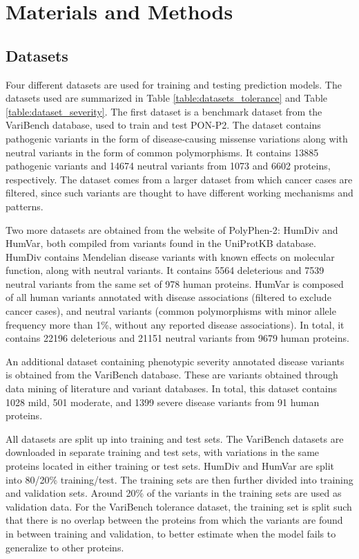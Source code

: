 \documentclass[11pt]{article}
\begin{document}
\section{Materials and Methods}

\subsection{Datasets}

Four different datasets are used for training and testing prediction models. The datasets used are summarized in Table \ref{table:datasets_tolerance} and Table \ref{table:dataset_severity}. 
The first dataset is a benchmark dataset from the VariBench\cite{nair2013varibench} database, used to train and test PON-P2\cite{niroula2015pon}. The dataset contains pathogenic variants in the form of disease-causing missense variations along with neutral variants in the form of common polymorphisms. It contains 13885 pathogenic variants and 14674 neutral variants from 1073 and 6602 proteins, respectively. The dataset comes from a larger dataset from which cancer cases are filtered, since such variants are thought to have different working mechanisms and patterns.

Two more datasets are obtained from the website of PolyPhen-2\cite{PolyPhen-2data}: HumDiv and HumVar, both compiled from variants found in the UniProtKB database. HumDiv contains Mendelian disease variants with known effects on molecular function, along with neutral variants. It contains 5564 deleterious and 7539 neutral variants from the same set of 978 human proteins. HumVar is composed of all human variants annotated with disease associations (filtered to exclude cancer cases), and neutral variants (common polymorphisms with minor allele frequency more than 1\%, without any reported disease associations). In total, it contains 22196 deleterious and 21151 neutral variants from 9679 human proteins.

An additional dataset containing phenotypic severity annotated disease variants is obtained from the VariBench database. These are variants obtained through data mining of literature and variant databases\cite{niroula2017predicting}. In total, this dataset contains 1028 mild, 501 moderate, and 1399 severe disease variants from 91 human proteins.

All datasets are split up into training and test sets. The VariBench datasets are downloaded in separate training and test sets, with variations in the same proteins located in either training or test sets. HumDiv and HumVar are split into 80/20\% training/test. The training sets are then further divided into training and validation sets. Around 20\% of the variants in the training sets are used as validation data. For the VariBench tolerance dataset, the training set is split such that there is no overlap between the proteins from which the variants are found in between training and validation, to better estimate when the model fails to generalize to other proteins.
\end{document}
